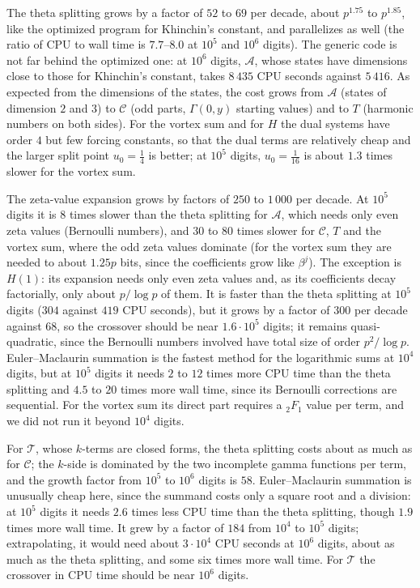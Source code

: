 \documentclass[11pt,reqno]{amsart}
\theoremstyle{definition}
\theoremstyle{remark}
\begin{document}
The theta splitting grows by a factor of $52$ to $69$ per decade, about $p^{1.75}$ to $p^{1.85}$, like the optimized
program for Khinchin's constant, and parallelizes as well (the ratio of CPU to wall time is $7.7$--$8.0$ at $10^5$ and
$10^6$ digits). The generic code is not far behind the optimized one: at $10^6$ digits, $\mathcal A$, whose states have
dimensions close to those for Khinchin's constant, takes $8\,435$ CPU seconds against $5\,416$. As expected from the
dimensions of the states, the cost grows from $\mathcal A$ (states of dimension $2$ and $3$) to $\mathcal C$ (odd
parts, $\Gamma(0,y)$ starting values) and to $T$ (harmonic numbers on both sides). For the vortex sum and for $H$ the
dual systems have order $4$ but few forcing constants, so that the dual terms are relatively cheap and the larger
split point $u_0 = \frac14$ is better; at $10^5$ digits, $u_0 = \frac1{16}$ is about $1.3$ times slower for the vortex
sum.

The zeta-value expansion grows by factors of $250$ to $1\,000$ per decade. At $10^5$ digits it is $8$ times slower than
the theta splitting for $\mathcal A$, which needs only even zeta values (Bernoulli numbers), and $30$ to $80$ times
slower for $\mathcal C$, $T$ and the vortex sum, where the odd zeta values dominate (for the vortex sum they are
needed to about $1.25p$ bits, since the coefficients grow like $\beta^j$). The exception is $H(1)$: its expansion needs
only even zeta values and, as its coefficients decay factorially, only about $p/\log p$ of them. It is faster than the
theta splitting at $10^5$ digits ($304$ against $419$ CPU seconds), but it grows by a factor of $300$ per decade
against $68$, so the crossover should be near $1.6\cdot10^5$ digits; it remains quasi-quadratic, since the Bernoulli
numbers involved have total size of order $p^2/\log p$. Euler--Maclaurin summation is the fastest method for the
logarithmic sums at $10^4$ digits, but at $10^5$ digits it needs $2$ to $12$ times more CPU time than the theta
splitting and $4.5$ to $20$ times more wall time, since its Bernoulli corrections are sequential. For the vortex sum its
direct part requires a ${}_2F_1$ value per term, and we did not run it beyond $10^4$ digits.

For $\mathcal T$, whose $k$-terms are closed forms, the theta splitting costs about as much as for $\mathcal C$; the
$k$-side is dominated by the two incomplete gamma functions per term, and the growth factor from $10^5$ to $10^6$
digits is $58$. Euler--Maclaurin summation is unusually cheap here, since the summand costs only a square root and a
division: at $10^5$ digits it needs $2.6$ times less CPU time than the theta splitting, though $1.9$ times more wall
time. It grew by a factor of $184$ from $10^4$ to $10^5$ digits; extrapolating, it would need about $3\cdot10^4$ CPU
seconds at $10^6$ digits, about as much as the theta splitting, and some six times more wall time. For
$\mathcal T$ the crossover in CPU time should be near $10^6$ digits.
\end{document}
